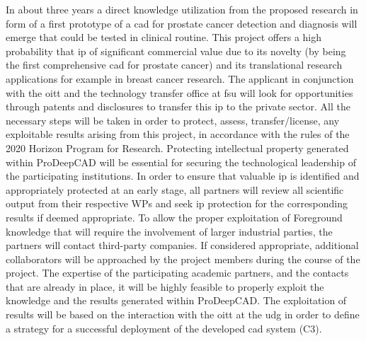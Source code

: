 In about three years a direct knowledge utilization from the proposed research in form of a first prototype of a \ac{cad} for prostate cancer detection and diagnosis will emerge that could be tested in clinical routine.
This project offers a high probability that \ac{ip} of significant commercial value due to its novelty (by being the first comprehensive \ac{cad} for prostate cancer) and its translational research applications for example in breast cancer research.
The applicant in conjunction with the \ac{oitt} and the technology transfer office at \ac{fsu} will look for opportunities through patents and disclosures to transfer this \ac{ip} to the private sector.
All the necessary steps will be taken in order to protect, assess, transfer/license, any exploitable results arising from this project, in accordance with the rules of the 2020 Horizon Program for Research.
Protecting intellectual property generated within ProDeepCAD will be essential for securing the technological leadership of the participating institutions.
In order to ensure that valuable \ac{ip} is identified and appropriately protected at an early stage, all partners will review all scientific output from their respective WPs and seek \ac{ip} protection for the corresponding results if deemed appropriate.
To allow the proper exploitation of Foreground knowledge that will require the involvement of larger industrial parties, the partners will contact third-party companies.
If considered appropriate, additional collaborators will be approached by the project members during the course of the project.
The expertise of the participating academic partners, and the contacts that are already in place, it will be highly feasible to properly exploit the knowledge and the results generated within ProDeepCAD.
The exploitation of results will be based on the interaction with the \ac{oitt} at the \ac{udg} in order to define a strategy for a successful deployment of the developed \ac{cad} system (C3).




